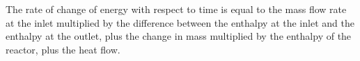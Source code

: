 The rate of change of energy with respect to time is equal to the mass flow rate at the inlet multiplied by the difference between the enthalpy at the inlet and the enthalpy at the outlet, plus the change in mass multiplied by the enthalpy of the reactor, plus the heat flow.